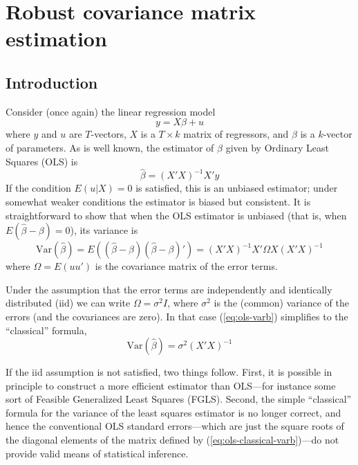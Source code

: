 \chapter{Robust covariance matrix estimation}
\label{chap:robust_vcv}

\section{Introduction}
\label{vcv-intro}

Consider (once again) the linear regression model
%
\begin{equation}
\label{eq:ols-again}
y = X\beta + u
\end{equation}
%
where $y$ and $u$ are $T$-vectors, $X$ is a $T \times k$ matrix of
regressors, and $\beta$ is a $k$-vector of parameters.  As is well
known, the estimator of $\beta$ given by Ordinary Least Squares (OLS)
is
%
\begin{equation}
\label{eq:ols-betahat}
\hat{\beta} = (X'X)^{-1} X'y
\end{equation}
%
If the condition $E(u|X) = 0$ is satisfied, this is an unbiased
estimator; under somewhat weaker conditions the estimator is biased
but consistent.  It is straightforward to show that when the OLS
estimator is unbiased (that is, when $E(\hat{\beta}-\beta) = 0$), its
variance is
%
\begin{equation}
\label{eq:ols-varb}
\mbox{Var}(\hat{\beta}) = 
  E\left((\hat{\beta}-\beta)(\hat{\beta}-\beta)'\right) 
  = (X'X)^{-1} X' \Omega X (X'X)^{-1}
\end{equation}
%
where $\Omega = E(uu')$ is the covariance matrix of the error terms.

Under the assumption that the error terms are independently and
identically distributed (iid) we can write $\Omega = \sigma^2 I$,
where $\sigma^2$ is the (common) variance of the errors (and the
covariances are zero).  In that case (\ref{eq:ols-varb}) simplifies to
the ``classical'' formula,
%
\begin{equation}
\label{eq:ols-classical-varb}
\mbox{Var}(\hat{\beta}) = \sigma^2(X'X)^{-1}
\end{equation}

If the iid assumption is not satisfied, two things follow.  First, it
is possible in principle to construct a more efficient estimator than
OLS---for instance some sort of Feasible Generalized Least Squares
(FGLS).  Second, the simple ``classical'' formula for the variance of
the least squares estimator is no longer correct, and hence the
conventional OLS standard errors---which are just the square roots of
the diagonal elements of the matrix defined by
(\ref{eq:ols-classical-varb})---do not provide valid means of
statistical inference.

